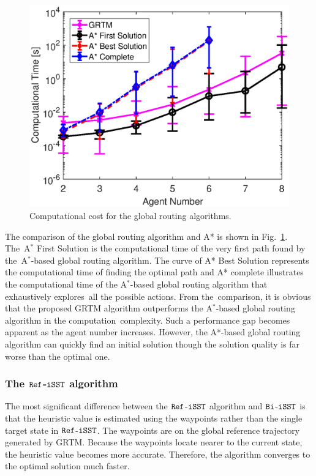 \documentclass[conference, onecolumn]{IEEEtran}
\begin{document}
\begin{figure}[thb!]

	\centering
	\includegraphics[scale=0.6]{globalroute}
	\caption{Computational cost for the global routing algorithms. }
	\label{globalroutefig}
\end{figure}


The comparison of the global routing algorithm and A* is shown in Fig.~\ref{globalroutefig}. The A$^*$ First Solution is the computational time of the very first path found by the A$^*$-based global routing algorithm. The curve of A* Best Solution represents the computational time of finding the optimal path and A* complete illustrates the computational time of the A$^*$-based global routing algorithm that exhaustively explores all the possible actions. From the comparison, it is obvious that the proposed GRTM algorithm outperforms the A$^*$-based global routing algorithm in the computation complexity. Such a performance gap becomes apparent as the agent number increases. However, the A*-based global routing algorithm can quickly find an initial solution though the solution quality is far worse than the optimal one. 

\subsubsection{The ${{\tt Ref}}$-$\tt iSST$ algorithm}

 
The most significant difference between the $\tt Ref$-$\tt iSST$ algorithm and $\tt Bi$-$\tt iSST$ is that the heuristic value is estimated using the waypoints rather than the single target state in $\tt Ref$-$\tt iSST$. The waypoints are on the global reference trajectory generated by GRTM. Because the waypoints locate nearer to the current state, the heuristic value becomes more accurate. Therefore, the algorithm converges to the optimal solution much faster.
\end{document}
